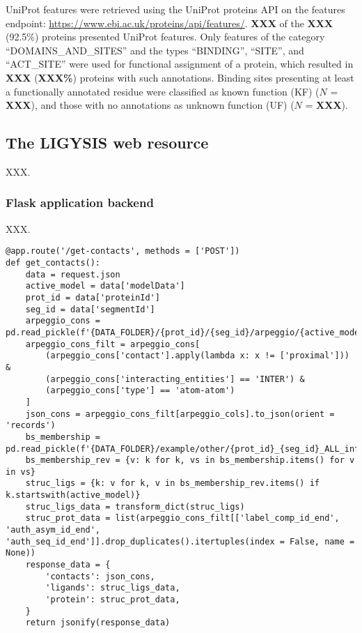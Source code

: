UniProt features were retrieved using the UniProt proteins API \cite{NIGHTINGALE_2017_API} on the features endpoint: \url{https://www.ebi.ac.uk/proteins/api/features/}. \textbf{XXX} of the \textbf{XXX} (92.5\%) proteins presented UniProt features. Only features of the category ``DOMAINS\_AND\_SITES'' and the types ``BINDING'', ``SITE'', and ``ACT\_SITE'' were used for functional assignment of a protein, which resulted in \textbf{XXX} (\textbf{XXX\%}) proteins with such annotations. Binding sites presenting at least a functionally annotated residue were classified as known function (KF) ($N$ = \textbf{XXX}), and those with no annotations as unknown function (UF) ($N$ = \textbf{XXX}). 

\subsection{The LIGYSIS web resource}

XXX.

\subsubsection{Flask application backend}

XXX.

\lstset{style=mystyle}

\begin{lstlisting}[language=MyPython, caption=Python Code from Screenshot]
@app.route('/get-contacts', methods = ['POST'])
def get_contacts():
    data = request.json
    active_model = data['modelData']
    prot_id = data['proteinId']
    seg_id = data['segmentId']
    arpeggio_cons = pd.read_pickle(f'{DATA_FOLDER}/{prot_id}/{seg_id}/arpeggio/{active_model}_bio_proc.pkl')
    arpeggio_cons_filt = arpeggio_cons[
        (arpeggio_cons['contact'].apply(lambda x: x != ['proximal'])) &
        (arpeggio_cons['interacting_entities'] == 'INTER') &
        (arpeggio_cons['type'] == 'atom-atom')
    ]
    json_cons = arpeggio_cons_filt[arpeggio_cols].to_json(orient = 'records')
    bs_membership = pd.read_pickle(f'{DATA_FOLDER}/example/other/{prot_id}_{seg_id}_ALL_inf_bss_membership.pkl')
    bs_membership_rev = {v: k for k, vs in bs_membership.items() for v in vs}
    struc_ligs = {k: v for k, v in bs_membership_rev.items() if k.startswith(active_model)}
    struc_ligs_data = transform_dict(struc_ligs)
    struc_prot_data = list(arpeggio_cons_filt[['label_comp_id_end', 'auth_asym_id_end', 'auth_seq_id_end']].drop_duplicates().itertuples(index = False, name = None))
    response_data = {
        'contacts': json_cons,
        'ligands': struc_ligs_data,
        'protein': struc_prot_data,
    }
    return jsonify(response_data)
\end{lstlisting}

